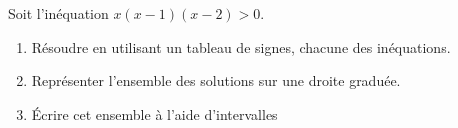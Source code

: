 
\begin{exercice}\label{exoPremiere-0024}

    Soit l'inéquation \( x(x-1)(x-2)>0\).
    \begin{enumerate}
        \item
     Résoudre en utilisant un tableau de signes, chacune des inéquations.
 \item Représenter l'ensemble des solutions sur une droite graduée.
\item Écrire cet ensemble à l'aide d'intervalles
 
    \end{enumerate}

\end{exercice}
